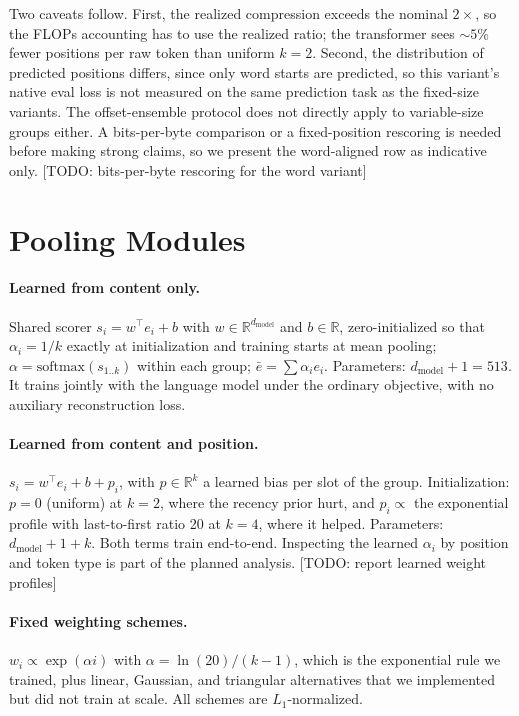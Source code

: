 \documentclass[11pt]{article}
\newcommand{\todo}[1]{\textcolor{warnred}{[TODO: #1]}}
\newcommand{\dmodel}{d_{\mathrm{model}}}
\begin{document}
Two caveats follow. First, the realized compression exceeds the nominal
$2\times$, so the FLOPs accounting has to use the realized ratio; the
transformer sees ${\sim}5\%$ fewer positions per raw token than uniform $k{=}2$.
Second, the distribution of predicted positions differs, since only word starts
are predicted, so this variant's native eval loss is not measured on the same
prediction task as the fixed-size variants. The offset-ensemble protocol does
not directly apply to variable-size groups either. A bits-per-byte comparison or
a fixed-position rescoring is needed before making strong claims, so we present
the word-aligned row as indicative only. \todo{bits-per-byte rescoring for the
word variant}

\section{Pooling Modules}
\label{app:pooling}

\paragraph{Learned from content only.}
Shared scorer $s_i = w^\top e_i + b$ with $w \in \mathbb{R}^{\dmodel}$ and $b
\in \mathbb{R}$, zero-initialized so that $\alpha_i = 1/k$ exactly at
initialization and training starts at mean pooling; $\alpha =
\mathrm{softmax}(s_{1..k})$ within each group; $\bar e = \sum \alpha_i e_i$.
Parameters: $\dmodel + 1 = 513$. It trains jointly with the language model
under the ordinary objective, with no auxiliary reconstruction loss.

\paragraph{Learned from content and position.}
$s_i = w^\top e_i + b + p_i$, with $p \in \mathbb{R}^k$ a learned bias per slot
of the group. Initialization: $p = 0$ (uniform) at $k{=}2$, where the recency
prior hurt, and $p_i \propto$ the exponential profile with last-to-first ratio 20
at $k{=}4$, where it helped. Parameters: $\dmodel + 1 + k$. Both terms train
end-to-end. Inspecting the learned $\alpha_i$ by position and token type is part
of the planned analysis. \todo{report learned weight profiles}

\paragraph{Fixed weighting schemes.}
$w_i \propto \exp(\alpha i)$ with $\alpha = \ln(20)/(k{-}1)$, which is the
exponential rule we trained, plus linear, Gaussian, and triangular alternatives
that we implemented but did not train at scale. All schemes are
$L_1$-normalized.
\end{document}

